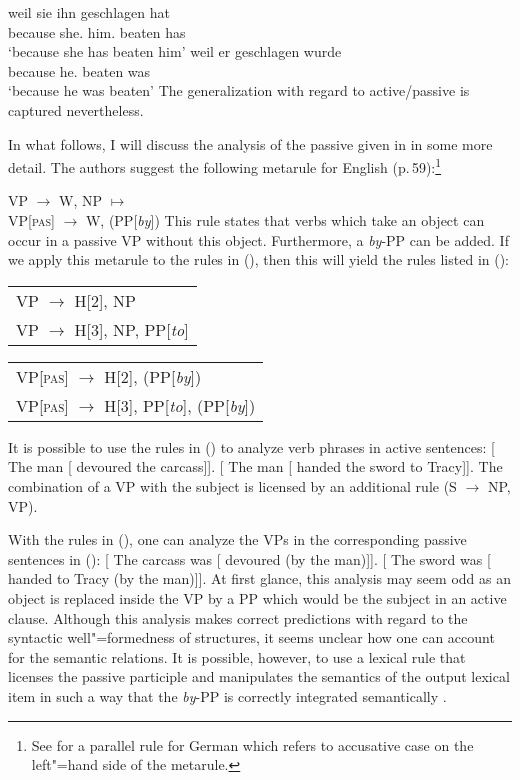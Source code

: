 \eal
\ex 
\gll weil sie ihn geschlagen hat\\
     because she.\nom{} him.\acc{} beaten has\\
\glt `because she has beaten him'
\ex 
\gll weil er geschlagen wurde\\
     because he.\nom{} beaten was\\
\glt `because he was beaten'
\zl
%
The generalization with regard to active/passive is captured nevertheless.

In what follows, I will discuss the analysis of the passive given in  in some more detail. The authors suggest the following metarule
for English (p.\,59):\footnote{
  See  for a parallel rule for German which refers to accusative case on the left"=hand side of the metarule.
}

\ea
VP  $\to$ W, NP $\mapsto$\\
VP[\textsc{pas}]  $\to$ W, (PP[\emph{by}])
\z
This rule states that verbs which take an object can occur in a passive VP without this object. Furthermore, a \emph{by}-PP can be added.
If we apply this metarule to the rules in (), then this will yield the rules listed in ():
\ea
\begin{tabular}[t]{@{}l@{}}
VP $\to$ H[2], NP\\
VP $\to$ H[3], NP, PP[\emph{to}]\\
\end{tabular}
\z
\ea
\begin{tabular}[t]{@{}l@{}}
VP[\textsc{pas}] $\to$ H[2], (PP[\emph{by}])\\
VP[\textsc{pas}] $\to$ H[3], PP[\emph{to}], (PP[\emph{by}])\\
\end{tabular}
\z
It is possible to use the rules in () to analyze verb phrases in active sentences:
\eal
\ex{} [ The man [ devoured the carcass]].
\ex{} [ The man [ handed the sword to Tracy]].
\zl
The combination of a VP with the subject is licensed by an additional rule (S $\to$ NP,
VP).

With the rules in (), one can analyze the VPs in the corresponding passive sentences in
(): 
\eal
\ex{} [ The carcass was [ devoured (by the man)]].
\ex{} [ The sword was [ handed to Tracy (by the man)]].
\zl
%
At first glance, this analysis may seem odd as an object is replaced inside the VP by a PP which would be the subject in an
active clause. Although this analysis makes correct predictions with regard to the syntactic well"=formedness of structures, it
seems unclear how one can account for the semantic relations. It is possible, however, to use a
lexical rule that licenses the passive participle and manipulates the semantics of
the output lexical item in such a way that the \emph{by}-PP is correctly integrated semantically \citep[]{GKPS85a}.

